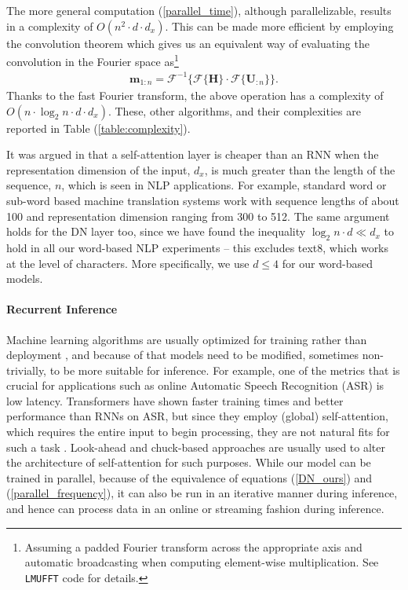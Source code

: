 \documentclass{article}
\def\vm{{\bm{m}}}
\def\mH{{\bm{H}}}
\def\mU{{\bm{U}}}
\begin{document}
The more general computation (\ref{parallel_time}), although parallelizable, results in a complexity of $O(n^2 \cdot d \cdot d_x)$. This can be made more efficient by employing the convolution theorem which gives us an equivalent way of evaluating the convolution in the Fourier space as\footnote{Assuming a padded Fourier transform across the appropriate axis and automatic broadcasting when computing element-wise multiplication. See \texttt{LMUFFT} code for  details.}
\begin{align}\label{parallel_frequency}
    \vm_{1:n} = \mathcal{F}^{-1}\{\mathcal{F}\{\mH\} \cdot \mathcal{F} \{\mU_{:n}\}\}.
\end{align}
Thanks to the fast Fourier transform, the above operation has a complexity of $O(n \cdot \log_2{n} \cdot d \cdot d_x)$. These, other algorithms, and their complexities are reported in Table (\ref{table:complexity}).

It was argued in \citet{vaswani2017attention} that a self-attention layer is cheaper than an RNN when the representation dimension of the input, $d_x$, is much greater than the length of the sequence, $n$, which is seen in NLP applications. For example, standard word or sub-word based machine translation systems work with sequence lengths of about 100 and representation dimension ranging from 300 to 512. The same argument holds for the DN layer too, since we have found the inequality $\log_2 n \cdot d \ll d_x$ to hold in all our word-based NLP experiments -- this excludes text8, which works at the level of characters.  More specifically, we use $d \leq 4$ for our word-based models.

\paragraph{Recurrent Inference} Machine learning algorithms are usually optimized for training rather than deployment \citep{crankshaw2019design}, and because of that models need to be modified, sometimes non-trivially, to be more suitable for inference. For example, one of the metrics that is crucial for applications such as online Automatic Speech Recognition (ASR) is low latency. Transformers have shown faster training times and better performance than RNNs on ASR, but since they employ (global) self-attention, which requires the entire input to begin processing, they are not natural fits for such a task \citep{wang2020reducing}. Look-ahead \citep{zhang2020transformer} and chuck-based \citep{miao2020transformer} approaches are usually used to alter the architecture of self-attention for such purposes. While our model can be trained in parallel, because of the equivalence of equations (\ref{DN_ours}) and (\ref{parallel_frequency}), it can also be run in an iterative manner during inference, and hence can process data in an online or streaming fashion during inference.
\end{document}
